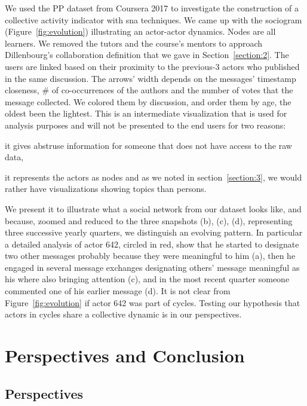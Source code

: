 \documentclass[a4paper,twoside]{article}
\begin{document}
We used the PP dataset from Coursera 2017 to investigate the construction of a collective activity indicator with \gls{sna} techniques.  We came up with the sociogram (Figure~\ref{fig:evolution}) illustrating an actor-actor dynamics.  Nodes are all learners.  We removed the tutors and the course's mentors to approach Dillenbourg's collaboration definition that we gave in Section~\ref{section:2}.  The users are linked based on their proximity to the previous-3 actors who published in the same discussion.  The arrows' width depends on the messages' timestamp closeness, \# of co-occurrences of the authors and the number of votes that the message collected.  We colored them by discussion, and order them by age, the oldest been the lightest.  This is an intermediate visualization that is used for analysis purposes and will not be presented to the end users for two reasons:
\begin{inparaenum}
\item it gives abstruse information for someone that does not have access to the raw data,
\item it represents the actors as nodes and as we noted in section~\ref{section:3}, we would rather have visualizations showing topics than persons.
\end{inparaenum}
We present it to illustrate what a social network from our dataset looks like, and because, zoomed and reduced to the three snapshots (b), (c), (d), representing three successive yearly quarters, we distinguish an evolving pattern.  In particular a detailed analysis of actor 642, circled in red, show that he started to designate two other messages probably because they were meaningful to him (a), then he engaged in several message exchanges designating others' message meaningful as his where also bringing attention (c), and in the most recent quarter someone commented one of his earlier message (d).  It is not clear from Figure~\ref{fig:evolution} if actor 642 was part of cycles.  Testing our hypothesis that actors in cycles share a collective dynamic is in our perspectives.

\section{Perspectives and Conclusion}
\label{section:6}


\subsection{Perspectives}
\end{document}
